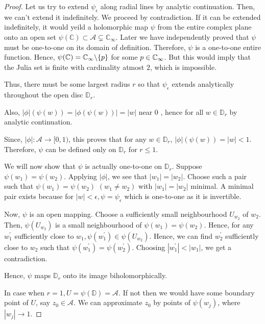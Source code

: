 \begin{proof}
	Let us try to extend $\psi_{\epsilon}$ along radial lines by analytic continuation. Then, we can't extend it indefinitely. We proceed by contradiction. If it can be extended indefinitely, it would yeild a holomorphic map $\psi$ from the entire complex plane onto an open set $\psi(\mathbb{C}) \subset \mathcal{A} \subsetneq \mathbb{C}_{\infty}$. Later we have independently proved that \( \psi \) must be one-to-one on its domain of definition. Therefore, \( \psi \) is a one-to-one entire function.
Hence, \( \psi(\mathbb{C})=\mathbb{C}_\infty \backslash \{p\} \) for some \( p\in \mathbb{C}_\infty \). But this would imply that the Julia set
is finite with cardinality atmost \( 2 \), which is impossible.

Thus, there must be some largest radius $r$ so that $\psi_{\epsilon}$ extends analytically throughout the open disc $\mathbb{D}_{r}$.

Also, $|\phi|(\psi(w))=|\phi(\psi(w))|=|w|$ near 0 , hence for all $w \in \mathbb{D}_{r}$ by analytic continuation.

Since, $|\phi|: \mathcal{A} \rightarrow[0,1)$, this proves that for any $w \in \mathbb{D}_{r}$, $|\phi|(\psi(w))=|w|<1$. Therefore, $\psi$ can be defined only on $\mathbb{D}_{r}$ for $r \leq 1$.

We will now show that $\psi$ is actually one-to-one on $\mathbb{D}_{r}$. Suppose $\psi\left(w_{1}\right)=\psi\left(w_{2}\right)$. Applying $|\phi|$, we see that $\left|w_{1}\right|=\left|w_{2}\right|$. Choose such a pair such that $\psi\left(w_{1}\right)=\psi\left(w_{2}\right)$ $\left(w_{1} \neq w_{2}\right)$ with $\left|w_{1}\right|=\left|w_{2}\right|$ minimal. A minimal pair exists because for $|w|<\epsilon, \psi=\psi_{\epsilon}$ which is one-to-one as it is invertible.

Now, $\psi$ is an open mapping. Choose a sufficiently small neighbourhood $U_{w_{2}}$ of $w_{2}$. Then, $\psi\left(U_{w_{2}}\right)$ is a small neighbourhood of $\psi\left(w_{1}\right)=\psi\left(w_{2}\right)$. Hence, for any $w_{1}^{\prime}$ sufficiently close to $w_{1}, \psi\left(w_{1}^{\prime}\right) \in \psi\left(U_{w_{2}}\right)$. Hence, we can find $w_{2}^{\prime}$ sufficiently close to $w_{2}$ such that $\psi\left(w_{1}^{\prime}\right)=\psi\left(w_{2}^{\prime}\right)$. Choosing $\left|w_{1}^{\prime}\right|<\left|w_{1}\right|$, we get a contradiction.

Hence, $\psi$ maps $\mathbb{D}_{r}$ onto its image biholomorphically.

In case when $r=1, U=\psi(\mathbb{D})=\mathcal{A}$. If not then we would have some boundary point of $U$, say $z_{0} \in \mathcal{A}$. We can approximate $z_{0}$ by points of $\psi\left(w_{j}\right)$, where $\left|w_{j}\right| \rightarrow 1$.


\end{proof}
